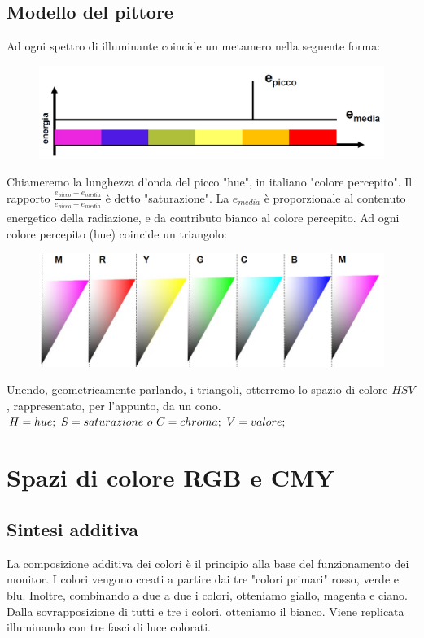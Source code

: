 \documentclass{report}
\begin{document}
	\subsection{Modello del pittore}
	Ad ogni spettro di illuminante coincide un metamero nella seguente forma:\\
	\begin{figure}[htp]
		\centering
		\includegraphics[width=1\linewidth]{modellodelpittore.png}
	\end{figure}
	Chiameremo la lunghezza d'onda del picco "hue", in italiano "colore percepito". Il rapporto $\frac{e_{picco}- e_{media}}{e_{picco} + e_{media}}$ è detto "saturazione". La $e_{media}$ è proporzionale al contenuto energetico della radiazione, e da contributo bianco al colore percepito.
	Ad ogni colore percepito (hue) coincide un triangolo:\\
	\begin{figure}[htp]
		\centering
		\includegraphics[width=1\linewidth]{hue1.png}
	\end{figure}
	Unendo, geometricamente parlando, i triangoli, otterremo lo spazio di colore $HSV$, rappresentato, per l'appunto, da un cono.
	$\\ H = hue;\\ \ S = saturazione \ o \ C = chroma ;\\ \ V = valore;$
	
	
	\section{Spazi di colore RGB e CMY}
	\subsection{Sintesi additiva}
	La composizione additiva dei colori è il principio alla base del funzionamento dei monitor. I colori vengono creati a partire dai tre "colori primari" rosso, verde e blu. Inoltre, combinando a due a due i colori, otteniamo giallo, magenta e ciano. Dalla sovrapposizione di tutti e tre i colori, otteniamo il bianco. Viene replicata illuminando con tre fasci di luce colorati.
\end{document}
